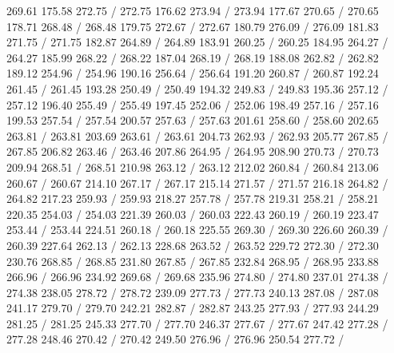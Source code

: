 { 269.61 175.58 272.75 /
 272.75 176.62 273.94 /
 273.94 177.67 270.65 /
 270.65 178.71 268.48 /
 268.48 179.75 272.67 /
 272.67 180.79 276.09 /
 276.09 181.83 271.75 /
 271.75 182.87 264.89 /
 264.89 183.91 260.25 /
 260.25 184.95 264.27 /
 264.27 185.99 268.22 /
 268.22 187.04 268.19 /
 268.19 188.08 262.82 /
 262.82 189.12 254.96 /
 254.96 190.16 256.64 /
 256.64 191.20 260.87 /
 260.87 192.24 261.45 /
 261.45 193.28 250.49 /
 250.49 194.32 249.83 /
 249.83 195.36 257.12 /
 257.12 196.40 255.49 /
 255.49 197.45 252.06 /
 252.06 198.49 257.16 /
 257.16 199.53 257.54 /
 257.54 200.57 257.63 /
 257.63 201.61 258.60 /
 258.60 202.65 263.81 /
 263.81 203.69 263.61 /
 263.61 204.73 262.93 /
 262.93 205.77 267.85 /
 267.85 206.82 263.46 /
 263.46 207.86 264.95 /
 264.95 208.90 270.73 /
 270.73 209.94 268.51 /
 268.51 210.98 263.12 /
 263.12 212.02 260.84 /
 260.84 213.06 260.67 /
 260.67 214.10 267.17 /
 267.17 215.14 271.57 /
 271.57 216.18 264.82 /
 264.82 217.23 259.93 /
 259.93 218.27 257.78 /
 257.78 219.31 258.21 /
 258.21 220.35 254.03 /
 254.03 221.39 260.03 /
 260.03 222.43 260.19 /
 260.19 223.47 253.44 /
 253.44 224.51 260.18 /
 260.18 225.55 269.30 /
 269.30 226.60 260.39 /
 260.39 227.64 262.13 /
 262.13 228.68 263.52 /
 263.52 229.72 272.30 /
 272.30 230.76 268.85 /
 268.85 231.80 267.85 /
 267.85 232.84 268.95 /
 268.95 233.88 266.96 /
 266.96 234.92 269.68 /
 269.68 235.96 274.80 /
 274.80 237.01 274.38 /
 274.38 238.05 278.72 /
 278.72 239.09 277.73 /
 277.73 240.13 287.08 /
 287.08 241.17 279.70 /
 279.70 242.21 282.87 /
 282.87 243.25 277.93 /
 277.93 244.29 281.25 /
 281.25 245.33 277.70 /
 277.70 246.37 277.67 /
 277.67 247.42 277.28 /
 277.28 248.46 270.42 /
 270.42 249.50 276.96 /
 276.96 250.54 277.72 /
}
